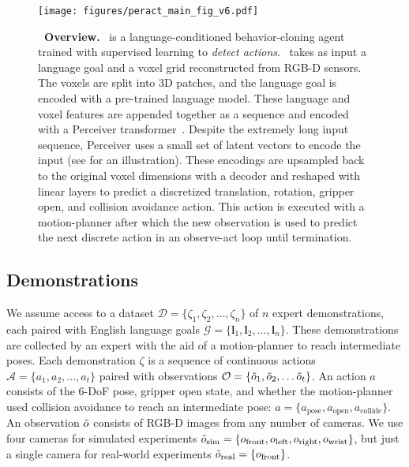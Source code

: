 \newpage
\begin{figure*}[!t]
    \centering
    \hspace*{-2.2cm}
    \texttt{[image: figures/peract\_main\_fig\_v6.pdf]}
    \vspace{-0.4cm}
    \caption{\textbf{\model~Overview.} \model~is a language-conditioned behavior-cloning agent  trained with supervised learning to \textit{detect actions}. \model~takes as input a language goal and a voxel grid reconstructed from RGB-D sensors. The voxels are split into 3D patches, and the language goal is encoded with a pre-trained language model. These language and voxel features are appended together as a sequence and encoded with a Perceiver transformer~\citep{jaegle2021perceiver}. 
    Despite the extremely long input sequence, Perceiver uses a small set of latent vectors to encode the input (see  for an illustration). 
    These encodings are upsampled back to the original voxel dimensions with a decoder and reshaped with linear layers to predict a discretized translation, rotation, gripper open, and collision avoidance action. This action is executed with a motion-planner after which the new observation is used to predict the next discrete action in an observe-act loop until termination. 
    }
    \label{fig:peract}
    \vspace{-1.5em}
\end{figure*}
 
\vspace{-0.3cm} 
\subsection{Demonstrations} \label{sec:demos}
\vspace{-0.2cm}
We assume access to a dataset  $\mathcal{D} = \{\zeta_1, \zeta_2, \ldots, \zeta_n\}$ of $n$ expert demonstrations, each paired with English language goals $\mathcal{G} = \{\mathbf{l}_{1}, \mathbf{l}_{2}, \ldots, \mathbf{l}_{n}\}$. 
These demonstrations are collected by an expert with the aid of a motion-planner to reach intermediate poses. Each demonstration $\zeta$ is a sequence of continuous actions $\mathcal{A} = \{a_{1}, a_{2}, \ldots, a_{t}\}$ paired with observations $\mathcal{O} = \{\Tilde{o}_{1}, \Tilde{o}_{2}, \ldots \Tilde{o}_{t}\}$. An action $a$ consists of the 6-DoF pose, gripper open state, and whether the motion-planner used collision avoidance to reach an intermediate pose: $a = \{a_{\textrm{pose}}, a_{\textrm{open}}, a_{\textrm{collide}}\}$. 
An observation $\Tilde{o}$ consists of RGB-D images from any number of cameras. We use four cameras for simulated experiments $\Tilde{o}_{\textrm{sim}} = \{o_{\textrm{front}}, o_{\textrm{left}}, o_{\textrm{right}}, o_{\textrm{wrist}} \}$, but just a single camera  for real-world experiments $\Tilde{o}_{\textrm{real}} = \{o_{\textrm{front}} \}$.  
\vspace{-0.2cm}
